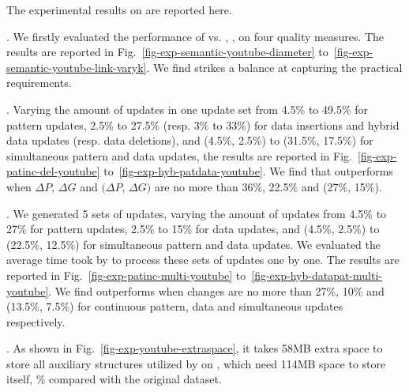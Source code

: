 \vspace{-1.5ex}
The experimental results on \youtube are reported here.

\vspace{-1.8ex}
. We firstly evaluated the performance of \optgrouprec vs. \mindia, \minsumdis, \denalk on \youtube \wrt four quality measures.
The results are reported in Fig.~\ref{fig-exp-semantic-youtube-diameter} to~\ref{fig-exp-semantic-youtube-link-varyk}.
We find \optgrouprec strikes a balance at capturing the practical requirements.

\vspace{-1.8ex}
. Varying the amount of updates in one update set from 4.5\% to 49.5\% for pattern updates, 2.5\% to 27.5\% (resp. 3\% to 33\%) for data insertions and hybrid data updates (resp. data deletions), and (4.5\%, 2.5\%) to (31.5\%, 17.5\%) for simultaneous pattern and data updates, the results are reported in Fig.~\ref{fig-exp-patinc-del-youtube} to~\ref{fig-exp-hyb-patdata-youtube}.
We find that \inc outperforms \optgrouprec when $\Delta P$, $\Delta G$ and $(\Delta P$, $\Delta G)$ are no more than 36\%, 22.5\% and (27\%, 15\%).

\vspace{-1.8ex}
. We generated 5 sets of updates,
varying the amount of updates from 4.5\% to 27\% for pattern updates, 2.5\% to 15\% for data updates,
and (4.5\%, 2.5\%) to (22.5\%, 12.5\%) for simultaneous pattern and data updates.
We evaluated the average time took by \inc to process these sets of updates one by one.
The results are reported in Fig.~\ref{fig-exp-patinc-multi-youtube} to~\ref{fig-exp-hyb-datapat-multi-youtube}.
We find \inc outperforms \optgrouprec when changes are no more than 27\%, 10\% and (13.5\%, 7.5\%) for continuous pattern, data and simultaneous updates respectively.

\vspace{-1.8ex}
. As shown in Fig.~\ref{fig-exp-youtube-extraspace},
it takes 58MB extra space to store all auxiliary structures utilized by \inc on \youtube, which need 114MB space to store itself,
\% compared with the original dataset.
